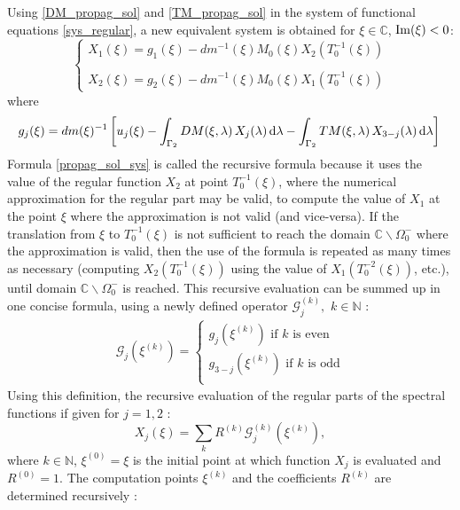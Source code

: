 Using \eqref{DM_propag_sol} and \eqref{TM_propag_sol} in the system of functional equations \eqref{sys_regular}, a new equivalent system is obtained for $\xi \in \mathbb{C}$, ${\rm Im}(\xi) <0$:
\begin{equation}
\label{propag_sol_sys}
\begin{cases}
X_1(\xi) = g_1(\xi) -  dm^{-1}(\xi)M_0(\xi)X_2(T_0^{-1}(\xi)) \\
\\
X_2(\xi) = g_2(\xi) - dm^{-1}(\xi)M_0(\xi)X_1(T_0^{-1}(\xi))
\end{cases}
\end{equation}
where
\begin{equation}
g_j(\xi) = dm(\xi)^{-1} \left[ u_j(\xi) - \int_{\Gamma_2} DM(\xi,\lambda) \, X_j(\lambda) \, {\rm d} \lambda - \int_{\Gamma_2} TM(\xi,\lambda) \, X_{3-j}(\lambda) \, {\rm d} \lambda \right] \\
\end{equation}
Formula \eqref{propag_sol_sys} is called the recursive formula because it uses the value of the regular function $X_2$ at point $T_0^{-1}(\xi)$, where the numerical approximation for the regular part may be valid, to compute the value of $X_1$ at the point $\xi$ where the approximation is not valid (and vice-versa). If the translation from $\xi$ to $T_0^{-1}(\xi)$ is not sufficient to reach the domain $\mathbb{C} \backslash \Omega_0^-$ where the approximation is valid, then the use of the formula is repeated as many times as necessary (computing $X_2(T_0^{-1}(\xi))$ using the value of $X_1(T_0^{-2}(\xi))$, etc.), until domain $\mathbb{C} \backslash \Omega_0^-$ is reached. This recursive evaluation can be summed up in one concise formula, using a newly defined operator $\mathcal{G}_j^{(k)}, \, \, k \in \mathbb{N}$ :
\begin{eqnarray}
\mathcal{G}_j(\xi^{(k)})=
\left\{
\begin{array}{l}
g_j(\xi^{(k)}) \mbox{ if }k \mbox{ is even } \\
g_{3-j}(\xi^{(k)}) \mbox{ if }k \mbox{ is odd}\\
\end{array}
\right.
\end{eqnarray}
Using this definition, the recursive evaluation of the regular parts of the spectral functions if given for $j=1,2$ :
\begin{equation}
X_j(\xi)= \sum_{k} R^{(k)}\mathcal{G}_j^{(k)}(\xi^{(k)}),
\label{prop_concise_ac}
\end{equation}
where $k \in \mathbb{N}$, $\xi^{(0)}=\xi$ is the initial point at which function $X_j$ is evaluated and $R^{(0)}=1$. The computation points $\xi^{(k)}$ and the coefficients $R^{(k)}$ are determined recursively :
